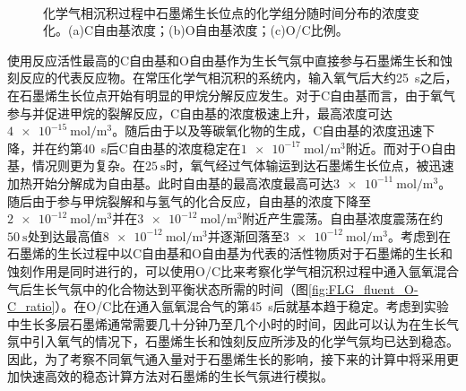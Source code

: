 \begin{figure}[htb]
{    }\\
    \caption{化学气相沉积过程中石墨烯生长位点的化学组分随时间分布的浓度变化。(a)C自由基浓度；(b)O自由基浓度；(c)O/C比例。}
    \label{fig:FLG_fluent}
\end{figure}

使用反应活性最高的C自由基和O自由基作为生长气氛中直接参与石墨烯生长和蚀刻反应的代表反应物。在常压化学气相沉积的系统内，输入氧气后大约\SI{25}{\second}之后，在石墨烯生长位点开始有明显的甲烷分解反应发生。对于C自由基而言，由于氧气参与并促进甲烷的裂解反应，C自由基的浓度极速上升，最高浓度可达$\SI{4e-15}{\mole\per\cubic\metre}$。随后由于以及等碳氧化物的生成，C自由基的浓度迅速下降，并在约第\SI{40}{\second}后C自由基的浓度稳定在$\SI{1e-17}{\mole\per\cubic\metre}$附近。而对于O自由基，情况则更为复杂。在$\SI{25}{\second}$时，氧气经过气体输运到达石墨烯生长位点，被迅速加热开始分解成为自由基。此时自由基的最高浓度最高可达$\SI{3e-11}{\mole\per\cubic\metre}$。随后由于参与甲烷裂解和与氢气的化合反应，自由基的浓度下降至$\SI{2e-12}{\mole\per\cubic\metre}$并在$\SI{3e-12}{\mole\per\cubic\metre}$附近产生震荡。自由基浓度震荡在约$\SI{50}{\second}$处到达最高值$\SI{8e-12}{\mole\per\cubic\metre}$并逐渐回落至$\SI{3e-12}{\mole\per\cubic\metre}$。考虑到在石墨烯的生长过程中以C自由基和O自由基为代表的活性物质对于石墨烯的生长和蚀刻作用是同时进行的，可以使用O/C比来考察化学气相沉积过程中通入氩氧混合气后生长气氛中的化合物达到平衡状态所需的时间（图\ref{fig:FLG_fluent_O-C_ratio}）。在O/C比在通入氩氧混合气的第\SI{45}{\second}后就基本趋于稳定。考虑到实验中生长多层石墨烯通常需要几十分钟乃至几个小时的时间，因此可以认为在生长气氛中引入氧气的情况下，石墨烯生长和蚀刻反应所涉及的化学气氛均已达到稳态。因此，为了考察不同氧气通入量对于石墨烯生长的影响，接下来的计算中将采用更加快速高效的稳态计算方法对石墨烯的生长气氛进行模拟。


